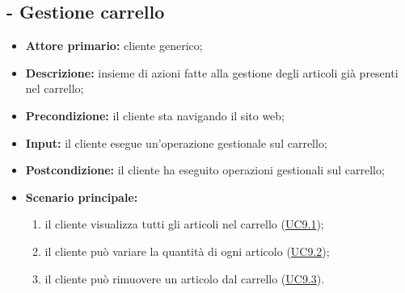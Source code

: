 \subsection{ - Gestione carrello}
\begin{itemize}
    \item \textbf{Attore primario:} cliente generico;
    \item \textbf{Descrizione:} insieme di azioni fatte alla gestione degli articoli già presenti nel carrello;
    \item \textbf{Precondizione:} il cliente sta navigando il sito web;
    \item \textbf{Input:} il cliente esegue un'operazione gestionale sul carrello;
    \item \textbf{Postcondizione:} il cliente ha eseguito operazioni gestionali sul carrello;
    \item \textbf{Scenario principale:}
          \begin{enumerate}
              \item il cliente visualizza tutti gli articoli nel carrello (\hyperref[UC9.1]{UC9.1});
              \item il cliente può variare la quantità di ogni articolo (\hyperref[UC9.2]{UC9.2});
              \item il cliente può rimuovere un articolo dal carrello (\hyperref[UC9.3]{UC9.3}).
          \end{enumerate}
    
\end{itemize}

\stepsubUserCase
